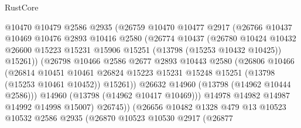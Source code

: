 \begin{lexlean}{RustCore}
\begin{coremodule}
                        @10470
                        @10479
                        @2586
                        @2935
                        (@26759
                          @10470
                          @10477
                          @2917
                          (@26766
                            @10437
                            @10469
                            @10476
                            @2893
                            @10416
                            @2580
                            (@26774
                              @10437
                              (@26780
                                @10424
                                @10432
                                @26600
                                @15223
                                @15231
                                @15906
                                @15251
                                (@13798 (@15253 @10432 @10425))
                                @15261))
                            (@26798
                              @10466
                              @2586
                              @2677
                              @2893
                              @10443
                              @2580
                              (@26806
                                @10466
                                (@26814
                                  @10451
                                  @10461
                                  @26824
                                  @15223
                                  @15231
                                  @15248
                                  @15251
                                  (@13798 (@15253 @10461 @10452))
                                  @15261))
                              @26632
                              @14960
                              (@13798 (@14962 @10444 @2586)))
                            @14960
                            (@13798 (@14962 @10417 @10469)))
                          @14978
                          @14982
                          @14987
                          @14992
                          @14998
                          @15007)
                        @26745))
                    (@26656
                      @10482
                      @1328
                      @479
                      @13
                      @10523
                      @10532
                      @2586
                      @2935
                      (@26870
                        @10523
                        @10530
                        @2917
                        (@26877

\end{coremodule}
\end{lexlean}
